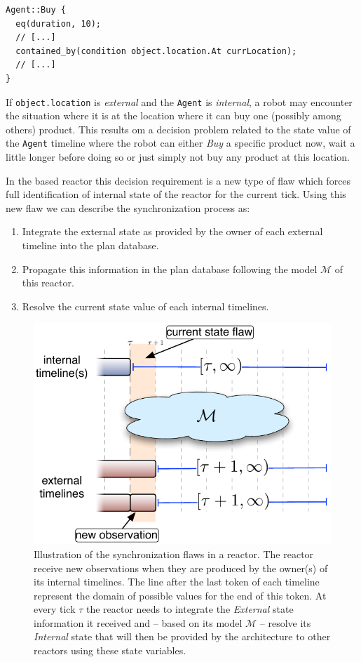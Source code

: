 \begin{verbatim}
Agent::Buy {
  eq(duration, 10);
  // [...]
  contained_by(condition object.location.At currLocation);
  // [...]
}
\end{verbatim}

If \texttt{object.location} is {\em external} and the \texttt{Agent}
is {\em internal}, a robot may encounter the situation where it is at
the location where it can buy one (possibly among others)
product. This results om a decision problem related to the state value
of the \texttt{Agent} timeline where the robot can either {\em Buy} a
specific product now, wait a little longer before doing so or just
simply not buy any product at this location.

In the \eu based reactor this decision requirement is a new type of
flaw which forces full identification of internal state of the reactor
for the current tick. Using this new flaw we can describe the
synchronization process as:

\begin{enumerate}

\item Integrate the external state as provided by the owner of each
  external timeline into the plan database.

\item Propagate this information in the plan database following the
  model $\mathcal{M}$ of this reactor.

\item Resolve the current state value of each internal timelines.

\end{enumerate}

\begin{figure}[!htbp]
  \centering
  \includegraphics[width=0.5\columnwidth]{figs/synch-relation}
  \caption{\small Illustration of the synchronization flaws in a reactor. The
    reactor receive new observations when they are produced by the
    owner(s) of its internal timelines. The line after the last token
    of each timeline represent the domain of possible values for the
    end of this token. At every tick $\tau$ the reactor needs to
    integrate the {\em External} state information it received and --
    based on its model $\mathcal{M}$ -- resolve its {\em Internal}
    state that will then be provided by the architecture to other
    reactors using these state variables.}
  \label{fig:synch:flaw}
\end{figure}

